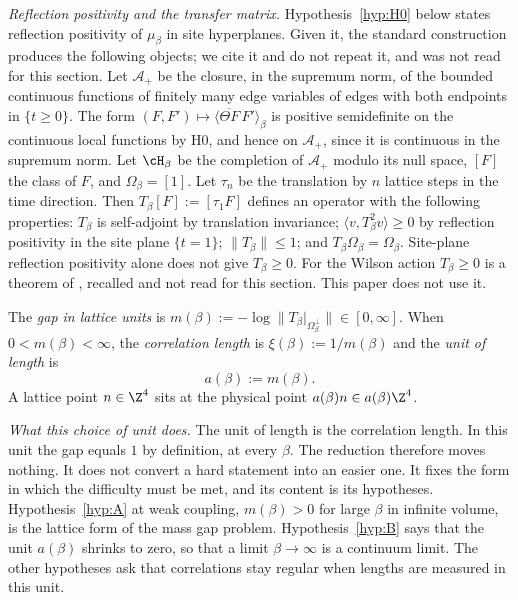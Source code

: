 \emph{Reflection positivity and the transfer matrix.} Hypothesis~\ref{hyp:H0} below states reflection positivity of $\mu_\beta$ in site hyperplanes. Given it, the standard construction \cite{OS78} produces the following objects; we cite it and do not repeat it, and \cite{OS78} was not read for this section. Let $\mathcal{A}_+$ be the closure, in the supremum norm, of the bounded continuous functions of finitely many edge variables of edges with both endpoints in $\{t\ge0\}$. The form $(F,F')\mapsto\langle\overline{\Theta F}\,F'\rangle_\beta$ is positive semidefinite on the continuous local functions by H0, and hence on $\mathcal{A}_+$, since it is continuous in the supremum norm. Let $\cH_\beta$ be the completion of $\mathcal{A}_+$ modulo its null space, $[F]$ the class of $F$, and $\Omega_\beta=[1]$. Let $\tau_n$ be the translation by $n$ lattice steps in the time direction. Then $T_\beta[F]:=[\tau_1F]$ defines an operator with the following properties: $T_\beta$ is self-adjoint by translation invariance; $\langle v,T_\beta^2v\rangle\ge0$ by reflection positivity in the site plane $\{t=1\}$; $\|T_\beta\|\le1$; and $T_\beta\Omega_\beta=\Omega_\beta$. Site-plane reflection positivity alone does not give $T_\beta\ge0$. For the Wilson action $T_\beta\ge0$ is a theorem of \cite{Lu77}, recalled and not read for this section. This paper does not use it.

\begin{definition}\label{red:def-gap}
The \emph{gap in lattice units} is $m(\beta):=-\log\|T_\beta|_{\Omega_\beta^\perp}\|\in[0,\infty]$. When $0<m(\beta)<\infty$, the \emph{correlation length} is $\xi(\beta):=1/m(\beta)$ and the \emph{unit of length} is
\[
  a(\beta):=m(\beta).
\]
A lattice point $n\in\Z^4$ sits at the physical point $a(\beta)n\in a(\beta)\Z^4$.
\end{definition}

\emph{What this choice of unit does.} The unit of length is the correlation length. In this unit the gap equals $1$ by definition, at every $\beta$. The reduction therefore moves nothing. It does not convert a hard statement into an easier one. It fixes the form in which the difficulty must be met, and its content is its hypotheses. Hypothesis~\ref{hyp:A} at weak coupling, $m(\beta)>0$ for large $\beta$ in infinite volume, is the lattice form of the mass gap problem. Hypothesis~\ref{hyp:B} says that the unit $a(\beta)$ shrinks to zero, so that a limit $\beta\to\infty$ is a continuum limit. The other hypotheses ask that correlations stay regular when lengths are measured in this unit.

